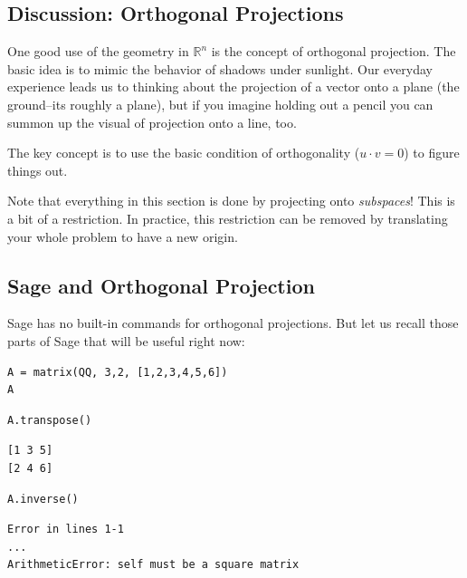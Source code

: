 \documentclass[10pt,]{book}
\theoremstyle{plain}
\theoremstyle{definition}
\numberwithin{equation}{section}
\begin{document}
\subsection[Discussion: Orthogonal Projections]{Discussion: Orthogonal Projections}\label{subsection-99}

        One good use of the geometry in \(\mathbb{R}^n\) is the concept of
        orthogonal projection. The basic idea is to mimic the behavior of
        shadows under sunlight. Our everyday experience leads us to thinking
        about the projection of a vector onto a plane (the ground--its roughly
        a plane), but if you imagine holding out a pencil you can summon up the
        visual of projection onto a line, too.
\par

        The key concept is to use the basic condition of orthogonality
        (\(u \cdot v = 0\)) to figure things out.
\par

        Note that everything in this section is done by projecting onto
        \emph{subspaces}! This is a bit of a restriction. In practice, this
        restriction can be removed by translating your whole problem to have a
        new origin.
\typeout{************************************************}
\typeout{************************************************}
\subsection[Sage and Orthogonal Projection]{Sage and Orthogonal Projection}\label{subsection-100}

        Sage has no built-in commands for orthogonal projections. But let us recall
        those parts of Sage that will be useful right now:
\begin{lstlisting}[style=sageinput]
A = matrix(QQ, 3,2, [1,2,3,4,5,6])
A
\end{lstlisting}
\begin{lstlisting}[style=sageinput]
A.transpose()
\end{lstlisting}
\begin{lstlisting}[style=sageoutput]
[1 3 5]
[2 4 6]
\end{lstlisting}
\begin{lstlisting}[style=sageinput]
A.inverse()
\end{lstlisting}
\begin{lstlisting}[style=sageoutput]
Error in lines 1-1
...
ArithmeticError: self must be a square matrix
\end{lstlisting}
\par
\end{document}
